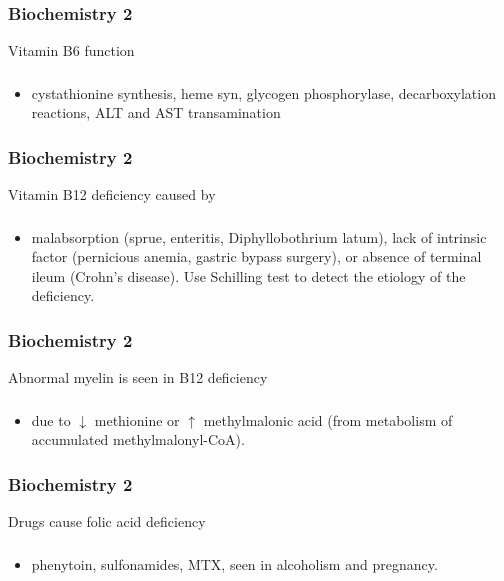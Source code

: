 \documentclass[11pt]{beamer}
\begin{document}
\begin{frame}
 \frametitle{Biochemistry 2}
Vitamin B6 function 
\end{frame}

\begin{frame}
 \frametitle{}
\begin{itemize}
\item cystathionine synthesis, heme syn, glycogen phosphorylase, decarboxylation reactions, ALT and AST transamination 
\end{itemize}
\end{frame}

\begin{frame}
 \frametitle{Biochemistry 2}
Vitamin B12 deficiency caused by
\end{frame}

\begin{frame}
 \frametitle{}
\begin{itemize}
\item malabsorption (sprue, enteritis, Diphyllobothrium latum), lack of intrinsic factor (pernicious anemia, gastric bypass surgery), or
absence of terminal ileum
(Crohn’s disease). Use Schilling test to detect
the etiology of the deficiency.
\end{itemize}
\end{frame}

\begin{frame}
 \frametitle{Biochemistry 2}
Abnormal myelin is seen in B12 deficiency 
\end{frame}

\begin{frame}
 \frametitle{}
\begin{itemize}
\item due to ${\downarrow}$ methionine or ${\uparrow}$ methylmalonic acid (from metabolism of accumulated methylmalonyl-CoA).
\end{itemize}
\end{frame}

\begin{frame}
 \frametitle{Biochemistry 2}
Drugs cause folic acid deficiency 
\end{frame}

\begin{frame}
 \frametitle{}
\begin{itemize}
\item phenytoin, sulfonamides, MTX, seen in alcoholism and pregnancy. 
\end{itemize}
\end{frame}
\end{document}
